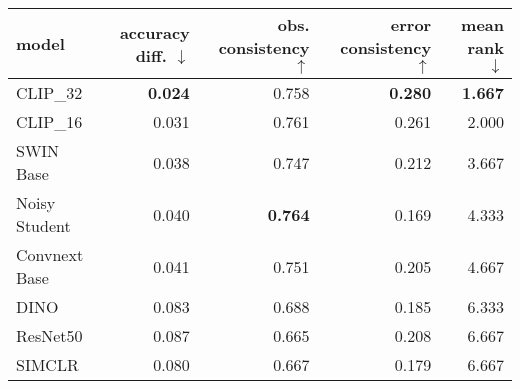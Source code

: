 \begin{tabular}{lrrrr}
\toprule
        model & accuracy diff. $\downarrow$ & obs. consistency $\uparrow$ & error consistency $\uparrow$ & mean rank $\downarrow$ \\
\midrule
     CLIP\_32 &              \textbf{0.024} &                       0.758 &               \textbf{0.280} &         \textbf{1.667} \\
     CLIP\_16 &                       0.031 &                       0.761 &                        0.261 &                  2.000 \\
    SWIN Base &                       0.038 &                       0.747 &                        0.212 &                  3.667 \\
Noisy Student &                       0.040 &              \textbf{0.764} &                        0.169 &                  4.333 \\
Convnext Base &                       0.041 &                       0.751 &                        0.205 &                  4.667 \\
         DINO &                       0.083 &                       0.688 &                        0.185 &                  6.333 \\
     ResNet50 &                       0.087 &                       0.665 &                        0.208 &                  6.667 \\
       SIMCLR &                       0.080 &                       0.667 &                        0.179 &                  6.667 \\
\bottomrule
\end{tabular}

